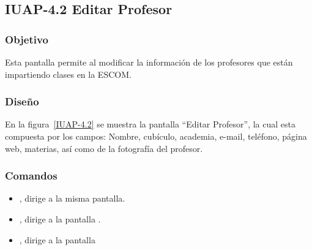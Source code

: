 \subsection{IUAP-4.2  Editar  Profesor}

\subsubsection{Objetivo}

	
    Esta pantalla permite al   modificar la información de los profesores que están impartiendo clases en la ESCOM.
\subsubsection{Diseño}


    En la figura~\ref{IUAP-4.2} se muestra la pantalla ``Editar Profesor'', la cual esta compuesta por los campos: Nombre, cubículo, academia, e-mail, teléfono, página web, materias, así como de la fotografía del profesor.



\subsubsection{Comandos}
    \begin{itemize}
	\item {}, dirige a la misma pantalla.
	\item {}, dirige a la pantalla .
	\item {}, dirige a la pantalla 
    \end{itemize}

